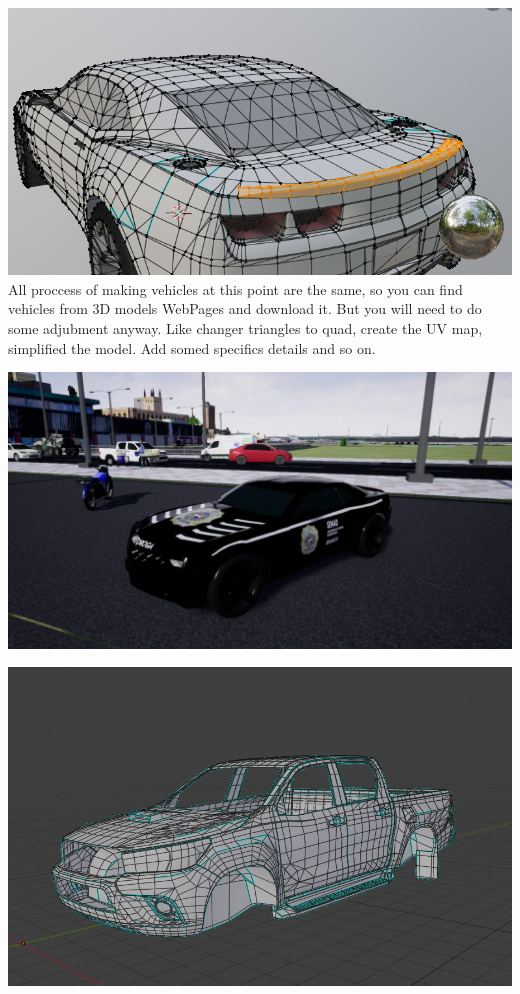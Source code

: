 \documentclass{article}
\begin{document}
  \includegraphics[width=\textwidth]{34.png}
  All proccess of making vehicles at this point are the same, so you can find vehicles from 3D models WebPages and download it. But you will need to do some adjubment anyway. Like changer triangles to quad, create the UV map, simplified the model. Add somed specifics details and so on.
  
  \includegraphics[width=\textwidth]{66.jpg}
  
  \includegraphics[width=\textwidth]{62.png}
\end{document}
